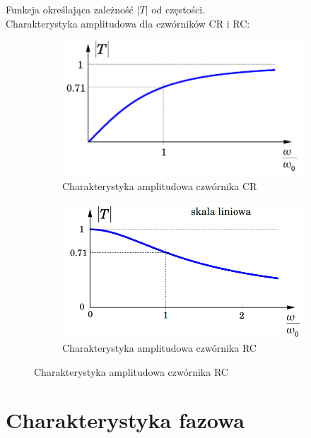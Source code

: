 Funkcja określająca zależność $|T|$ od częstości. \\
Charakterystyka amplitudowa dla czwórników CR i RC:
\begin{figure}[H]
    \centering
    \begin{subfigure}[h]{0.45\textwidth}
        \includegraphics[width=\textwidth]{img_wyklad/teor_amp_CR.png}
        \caption*{Charakterystyka amplitudowa czwórnika CR}
    \end{subfigure}
    \begin{subfigure}[h]{0.45\textwidth}
        \includegraphics[width=\textwidth]{img_wyklad/teor_amp_RC.png}
        \caption*{Charakterystyka amplitudowa czwórnika RC}
    \end{subfigure}
\end{figure}

\section{Charakterystyka fazowa}
\label{poprawa:charakterystyka_fazowa}

